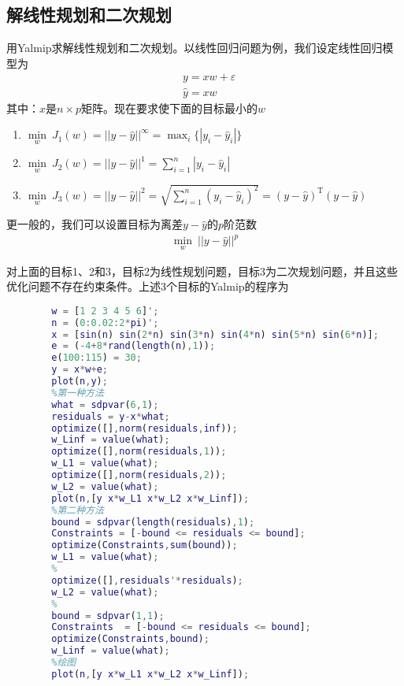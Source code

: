     \subsection{解线性规划和二次规划}
        \par
        用Yalmip求解线性规划和二次规划。以线性回归问题为例，我们设定线性回归模型为
        \begin{align*}
        &y = xw+\varepsilon\\
        &\hat{y} = xw
        \end{align*}
        其中：$x$是$n\times p$矩阵。现在要求使下面的目标最小的$w$
        \begin{enumerate}
        \item $\min\limits_w \ J_1(w) = ||y - \hat{y}||^\infty = \max_i \{|y_i - \hat{y}_i|\}$
        \item $\min\limits_w \ J_2(w) = ||y - \hat{y}||^1 = \sum_{i = 1}^n |y_i - \hat{y}_i|$
        \item $\min\limits_w \ J_3(w) = ||y - \hat{y}||^2 =  \sqrt{\sum_{i = 1}^n (y_i - \hat{y}_i)^2} = (y - \hat{y})^\mathrm{T}(y - \hat{y})$
        \end{enumerate}
        更一般的，我们可以设置目标为离差$y - \hat{y}$的$p$阶范数
        \begin{align*}
        \min_w \ ||y - \hat{y}||^p
        \end{align*}
        \par
        对上面的目标1、2和3，目标2为线性规划问题，目标3为二次规划问题，并且这些优化问题不存在约束条件。上述3个目标的Yalmip的程序为
        \begin{lstlisting}[language = Matlab]
        %% 线性规划&二次规划----线性回归示例
        w = [1 2 3 4 5 6]';
        n = (0:0.02:2*pi)';
        x = [sin(n) sin(2*n) sin(3*n) sin(4*n) sin(5*n) sin(6*n)];
        e = (-4+8*rand(length(n),1));
        e(100:115) = 30;
        y = x*w+e;
        plot(n,y);
        %第一种方法
        what = sdpvar(6,1);
        residuals = y-x*what;
        optimize([],norm(residuals,inf));
        w_Linf = value(what);
        optimize([],norm(residuals,1));
        w_L1 = value(what);
        optimize([],norm(residuals,2));
        w_L2 = value(what);
        plot(n,[y x*w_L1 x*w_L2 x*w_Linf]);
        %第二种方法
        bound = sdpvar(length(residuals),1);
        Constraints = [-bound <= residuals <= bound];
        optimize(Constraints,sum(bound));
        w_L1 = value(what);
        %
        optimize([],residuals'*residuals);
        w_L2 = value(what);
        %
        bound = sdpvar(1,1);
        Constraints  = [-bound <= residuals <= bound];
        optimize(Constraints,bound);
        w_Linf = value(what);
        %绘图
        plot(n,[y x*w_L1 x*w_L2 x*w_Linf]);
        \end{lstlisting}
